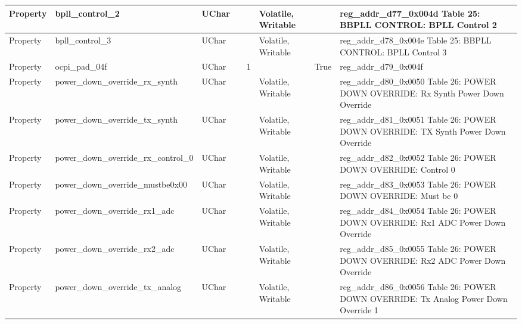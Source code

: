 \documentclass{article}
\begin{document}
\begin{scriptsize}
\begin{longtable}{|p{2cm}|p{5cm}|p{1cm}|p{2cm}|p{2cm}|p{1.75cm}|p{1.5cm}|p{5.1cm}|}
  \hline
  Property & bpll\_control\_2                                         & UChar &                  &                  & Volatile,  Writable &         & reg\_addr\_d77\_0x004d  Table 25: BBPLL CONTROL: BPLL Control 2 \\
  \hline
  Property & bpll\_control\_3                                         & UChar &                  &                  & Volatile,  Writable &         & reg\_addr\_d78\_0x004e  Table 25: BBPLL CONTROL: BPLL Control 3 \\
  \hline
  Property & ocpi\_pad\_04f                                           & UChar &                  & 1                &                     & True    & reg\_addr\_d79\_0x004f \\
  \hline
  Property & power\_down\_override\_rx\_synth                         & UChar &                  &                  & Volatile,  Writable &         & reg\_addr\_d80\_0x0050  Table 26: POWER DOWN OVERRIDE: Rx Synth Power Down Override \\
  \hline
  Property & power\_down\_override\_tx\_synth                         & UChar &                  &                  & Volatile,  Writable &         & reg\_addr\_d81\_0x0051  Table 26: POWER DOWN OVERRIDE: TX Synth Power Down Override \\
  \hline
  Property & power\_down\_override\_rx\_control\_0                    & UChar &                  &                  & Volatile,  Writable &         & reg\_addr\_d82\_0x0052  Table 26: POWER DOWN OVERRIDE: Control 0 \\
  \hline
  Property & power\_down\_override\_mustbe0x00                        & UChar &                  &                  & Volatile,  Writable &         & reg\_addr\_d83\_0x0053  Table 26: POWER DOWN OVERRIDE: Must be 0 \\
  \hline
  Property & power\_down\_override\_rx1\_adc                          & UChar &                  &                  & Volatile,  Writable &         & reg\_addr\_d84\_0x0054  Table 26: POWER DOWN OVERRIDE: Rx1 ADC Power Down Override \\
  \hline
  Property & power\_down\_override\_rx2\_adc                          & UChar &                  &                  & Volatile,  Writable &         & reg\_addr\_d85\_0x0055  Table 26: POWER DOWN OVERRIDE: Rx2 ADC Power Down Override \\
  \hline
  Property & power\_down\_override\_tx\_analog                        & UChar &                  &                  & Volatile,  Writable &         & reg\_addr\_d86\_0x0056  Table 26: POWER DOWN OVERRIDE: Tx Analog Power Down Override 1 \\

\end{longtable}
\end{scriptsize}
\end{document}

